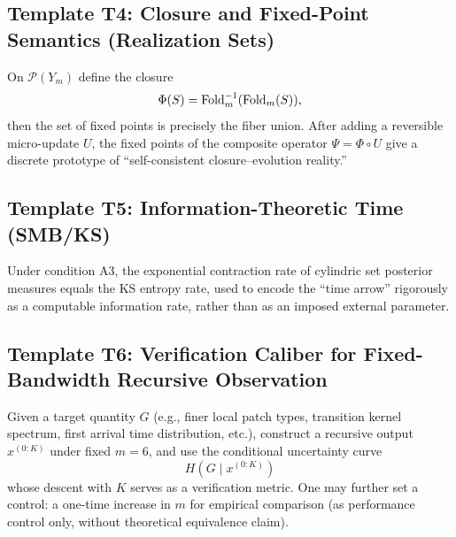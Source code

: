 \subsection{Template T4: Closure and Fixed-Point Semantics (Realization Sets)}

On $\mathcal{P}(Y_m)$ define the closure
\[
\Phi(S)=\mathrm{Fold}_m^{-1}(\mathrm{Fold}_m(S)),
\]
then the set of fixed points is precisely the fiber union.
After adding a reversible micro-update $U$, the fixed points of the composite operator $\Psi=\Phi\circ U$ give a discrete prototype of ``self-consistent closure--evolution reality.''

\subsection{Template T5: Information-Theoretic Time (SMB/KS)}

Under condition A3, the exponential contraction rate of cylindric set posterior measures equals the KS entropy rate, used to encode the ``time arrow'' rigorously as a computable information rate, rather than as an imposed external parameter.

\subsection{Template T6: Verification Caliber for Fixed-Bandwidth Recursive Observation}

Given a target quantity $G$ (e.g., finer local patch types, transition kernel spectrum, first arrival time distribution, etc.), construct a recursive output $x^{(0:K)}$ under fixed $m=6$, and use the conditional uncertainty curve
$$
H(G\mid x^{(0:K)})
$$
whose descent with $K$ serves as a verification metric. One may further set a control: a one-time increase in $m$ for empirical comparison (as performance control only, without theoretical equivalence claim).
